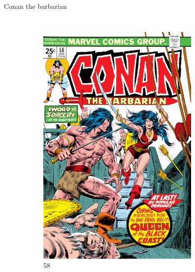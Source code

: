 \begin{frame}{Conan the barbarian}
	\begin{columns}
		\begin{figure}[htb]
			\centering
			\begin{subfigure}[b]{0.4\textwidth}
				\includegraphics[width=\textwidth]{img/CTB058}
				\caption{58}
			\end{subfigure}
			~
			\begin{subfigure}[b]{0.4\textwidth}

\end{subfigure}
\end{figure}
\end{columns}
\end{frame}
